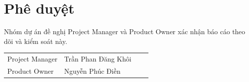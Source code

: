 \documentclass[12pt,a4paper]{report}
\begin{document}
\section{Phê duyệt}

Nhóm dự án đề nghị Project Manager và Product Owner xác nhận báo cáo theo dõi và kiểm soát này.

\begin{table}[H]
  \centering
  \renewcommand{\arraystretch}{2.4}
  \begin{tabularx}{\linewidth}{@{}P{3.6cm}LP{3.2cm}P{2.6cm}@{}}
    \toprule
     &  &  &  \\
    \midrule
    Project Manager & Trần Phan Đăng Khôi & & \\
    Product Owner & Nguyễn Phúc Điền & & \\
    \bottomrule
  \end{tabularx}
\end{table}
\end{document}
